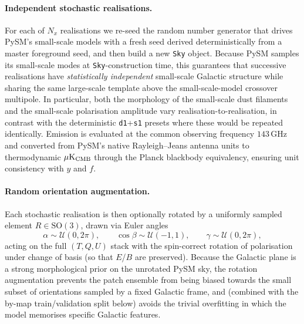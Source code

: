 \documentclass[11pt]{article}
\theoremstyle{definition}
\begin{document}
\paragraph{Independent stochastic realisations.}
For each of $N_x$ realisations we re-seed the random number generator that drives PySM's small-scale models with a fresh seed derived deterministically from a master foreground seed, and then build a new \texttt{Sky} object. Because PySM samples its small-scale modes at \texttt{Sky}-construction time, this guarantees that successive realisations have \emph{statistically independent} small-scale Galactic structure while sharing the same large-scale template above the small-scale-model crossover multipole. In particular, both the morphology of the small-scale dust filaments and the small-scale polarisation amplitude vary realisation-to-realisation, in contrast with the deterministic \texttt{d1}+\texttt{s1} presets where these would be repeated identically. Emission is evaluated at the common observing frequency $143\,\mathrm{GHz}$ and converted from PySM's native Rayleigh--Jeans antenna units to thermodynamic $\mu\mathrm{K}_{\rm CMB}$ through the Planck blackbody equivalency, ensuring unit consistency with $y$ and $f$.

\paragraph{Random orientation augmentation.}
Each stochastic realisation is then optionally rotated by a uniformly sampled element $R\in\mathrm{SO}(3)$, drawn via Euler angles
\begin{equation}
  \alpha\sim\mathcal U(0,2\pi),\qquad
  \cos\beta\sim\mathcal U(-1,1),\qquad
  \gamma\sim\mathcal U(0,2\pi),
  \label{eq:so3_uniform}
\end{equation}
acting on the full $(T,Q,U)$ stack with the spin-correct rotation of polarisation under change of basis (so that $E$/$B$ are preserved). Because the Galactic plane is a strong morphological prior on the unrotated PySM sky, the rotation augmentation prevents the patch ensemble from being biased towards the small subset of orientations sampled by a fixed Galactic frame, and (combined with the by-map train/validation split below) avoids the trivial overfitting in which the model memorises specific Galactic features.
\end{document}
